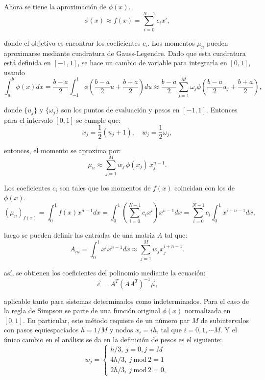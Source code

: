 \documentclass[titlepage,11pt]{report}
\begin{document}
Ahora se tiene la aproximación de $\phi(x)$.
\begin{equation*}
    \phi(x)\approx f(x)=\sum_{i=0}^{N-1} c_i x^i,
\end{equation*}

\noindent donde el objetivo es encontrar los coeficientes $c_i$. Los momentos $\mu_n$ pueden aproximarse mediante cuadratura de Gauss-Legendre. Dado que esta cuadratura está definida en $[-1,1]$, se hace un cambio de variable para integrarla en $[0,1]$, usando
\begin{equation*}
    \int_{a}^{b}\phi(x)dx=\frac{b-a}{2}\int_{-1}^{1}\phi\left(\frac{b-a}{2}u+\frac{b+a}{2}\right)du\approx \frac{b-a}{2}\sum_{j=1}^{M}\omega_j\phi\left(\frac{b-a}{2}u_j+\frac{b+a}{2}\right),
\end{equation*}

\noindent donde $\{u_j\}$ y $\{\omega_j\}$ son los puntos de evaluación y pesos en $[-1,1]$. Entonces para el intervalo $[0,1]$ se cumple que:
\begin{equation*}
    x_j = \frac{1}{2}(u_j + 1), \quad w_j = \frac{1}{2} \omega_j,
\end{equation*}

\noindent entonces, el momento se aproxima por:
\begin{equation*}
    \mu_n \approx \sum_{j=1}^{M} w_j \, \phi(x_j) \, x_j^{n-1}.
\end{equation*}


Los coeficientes $c_i$ son tales que los momentos de $f(x)$ coincidan con los de $\phi(x)$.
\begin{equation*}
    (\mu_n)_{f(x)} = \int_0^1 f(x) x^{n-1} dx = \int_0^1 \left( \sum_{i=0}^{N-1} c_i x^i \right) x^{n-1} dx = \sum_{i=0}^{N-1} c_i \int_0^1 x^{i+n-1} dx,
\end{equation*}

\noindent luego se pueden definir las entradas de una matriz $A$ tal que:
\begin{equation}\label{matrix}
    A_{ni} = \int_0^1 x^i x^{n-1} dx \approx \sum_{j=1}^{M} w_j x_j^{i + n -1}.
\end{equation}

\noindent así, se obtienen los coeficientes del polinomio mediante la ecuación:
\begin{equation}\label{sis}
    \vec{c} = A^T(AA^T)^{-1}\vec{\mu},
\end{equation}

\noindent aplicable tanto para sistemas determinados como indeterminados. Para el caso de la regla de Simpson se parte de una función original $\phi(x)$ normalizada en $[0,1]$. En particular, este método requiere de un número par $M$ de subintervalos con pasos equiespaciados $h=1/M$ y nodos $x_i=ih$, tal que $i=0,1,\cdots M$. Y el único cambio en el análisis se da en la definición de pesos es el siguiente:
\begin{equation*}
    w_j = \left\{ \begin{array}{lcc} h/3, \ j=0, j=M \\ 
    4h/3, \ j\ \text{mod}\ 2=1\\
    2h/3, \ j\ \text{mod}\ 2=0,\end{array}\right.
\end{equation*}
\end{document}
